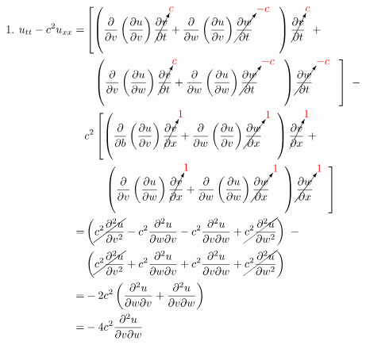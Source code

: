 \documentclass[11pt,fleqn]{book} %
\begin{document}
\begin{enumerate}
    \item $\begin{aligned}[t]
        u_{tt} - c^2 u_{xx}
        = & \left[ \left( \frac{\partial}{\partial v} \left( \frac{\partial u}{\partial v} \right) \cancelto{\color{red}c}{\frac{\partial v}{\partial t}} + \frac{\partial}{\partial w} \left( \frac{\partial u}{\partial v} \right) \cancelto{\color{red}-c}{\frac{\partial w}{\partial t}} ~~~~~~~ \right) \cancelto{\color{red}c}{\frac{\partial v}{\partial t}} \right. ~+ \\ & ~~ \left. \left( \frac{\partial}{\partial v} \left( \frac{\partial u}{\partial w} \right) \cancelto{\color{red}c}{\frac{\partial v}{\partial t}} + \frac{\partial}{\partial w} \left( \frac{\partial u}{\partial w} \right) \cancelto{\color{red}-c}{\frac{\partial w}{\partial t}} ~~~~~~~ \right) \cancelto{\color{red}-c}{\frac{\partial w}{\partial t}} ~~~~~~~ \right] ~- \\ & c^2 \left[ \left( \frac{\partial}{\partial b} \left( \frac{\partial u}{\partial v} \right) \cancelto{\color{red}1}{\frac{\partial v}{\partial x}} + \frac{\partial}{\partial w} \left( \frac{\partial u}{\partial v} \right) \cancelto{\color{red}1}{\frac{\partial w}{\partial x}} ~~~~ \right) \cancelto{\color{red}1}{\frac{\partial v}{\partial x}} ~+ \right. \\ & ~~~~~ \left. \left( \frac{\partial}{\partial v} \left( \frac{\partial u}{\partial w} \right) \cancelto{\color{red}1}{\frac{\partial v}{\partial x}} + \frac{\partial}{\partial w} \left( \frac{\partial u}{\partial w} \right) \cancelto{\color{red}1} {\frac{\partial w}{\partial x}} ~~~~ \right) \cancelto{\color{red}1}{\frac{\partial w}{\partial x}} ~~~~ \right] \\
        = & \left( \cancel{c^2 \frac{\partial^2 u}{\partial v^2}} - c^2 \frac{\partial^2 u}{\partial w \partial v} - c^2 \frac{\partial^2 u}{\partial v \partial w} + \cancel{c^2 \frac{\partial^2 u}{\partial w^2}} \right) ~- \\ & \left( \cancel{c^2 \frac{\partial^2 u}{\partial v^2}} + c^2 \frac{\partial^2 u}{\partial w \partial v} + c^2 \frac{\partial^2 u}{\partial v \partial w} + \cancel{c^2 \frac{\partial^2 u}{\partial w^2}} \right) \\
        = & -2c^2 \left( \frac{\partial^2 u}{\partial w \partial v} + \frac{\partial^2 u}{\partial v \partial w} \right) \\
        = & -4c^2 \frac{\partial^2 u}{\partial v \partial w}
    \end{aligned}$
    

\end{enumerate}
\end{document}
